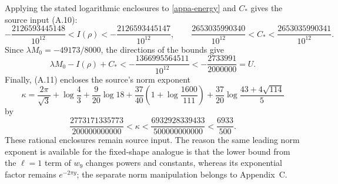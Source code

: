 Applying the stated logarithmic enclosures to \eqref{appa-energy} and
$C_*$ gives the source input (A.10):
\[
 -\frac{2126593445148}{10^{12}}<I(\rho)
              <-\frac{2126593445147}{10^{12}},\qquad
 \frac{2653035990340}{10^{12}}<C_*
              <\frac{2653035990341}{10^{12}}.
\]
Since $\lambda M_0=-49173/8000$, the directions of the bounds give
\[
 \lambda M_0-I(\rho)+C_*<-
 \frac{1366995564511}{10^{12}}<-
 \frac{2733991}{2000000}=U.
\]
Finally, (A.11) encloses the source's norm exponent
\[
 \kappa=\frac{2\pi}{\sqrt3}+\log\frac43+\frac9{20}\log18
 +\frac{37}{40}\left(1+\log\frac{1600}{111}\right)
 +\frac{37}{20}\log\frac{43+4\sqrt{114}}5
\]
by
\[
 \frac{2773171335773}{200000000000}<\kappa
 <\frac{6932928339433}{500000000000}<\frac{6933}{500}.
\]
These rational enclosures remain source input.  The reason the same
leading norm exponent is available for the fixed-shape analogue is that
the lower bound from the $\ell=1$ term of $w_9$ changes powers and
constants, whereas its exponential factor remains $e^{-2\pi y}$;
the separate norm manipulation belongs to Appendix~C.
